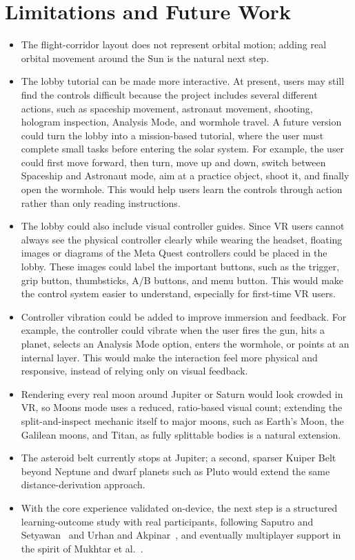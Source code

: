 \documentclass[journal]{vgtc}
\begin{document}
\section{Limitations and Future Work}
\begin{itemize}
\item The flight-corridor layout does not represent orbital motion; adding real orbital movement around the Sun is the natural next step.

\item The lobby tutorial can be made more interactive. At present, users may still find the controls difficult because the project includes several different actions, such as spaceship movement, astronaut movement, shooting, hologram inspection, Analysis Mode, and wormhole travel. A future version could turn the lobby into a mission-based tutorial, where the user must complete small tasks before entering the solar system. For example, the user could first move forward, then turn, move up and down, switch between Spaceship and Astronaut mode, aim at a practice object, shoot it, and finally open the wormhole. This would help users learn the controls through action rather than only reading instructions.

\item The lobby could also include visual controller guides. Since VR users cannot always see the physical controller clearly while wearing the headset, floating images or diagrams of the Meta Quest controllers could be placed in the lobby. These images could label the important buttons, such as the trigger, grip button, thumbsticks, A/B buttons, and menu button. This would make the control system easier to understand, especially for first-time VR users.

\item Controller vibration could be added to improve immersion and feedback. For example, the controller could vibrate when the user fires the gun, hits a planet, selects an Analysis Mode option, enters the wormhole, or points at an internal layer. This would make the interaction feel more physical and responsive, instead of relying only on visual feedback.

\item Rendering every real moon around Jupiter or Saturn would look crowded in VR, so Moons mode uses a reduced, ratio-based visual count; extending the split-and-inspect mechanic itself to major moons, such as Earth's Moon, the Galilean moons, and Titan, as fully splittable bodies is a natural extension.

\item The asteroid belt currently stops at Jupiter; a second, sparser Kuiper Belt beyond Neptune and dwarf planets such as Pluto would extend the same distance-derivation approach.

\item With the core experience validated on-device, the next step is a structured learning-outcome study with real participants, following Saputro and Setyawan~\cite{saputro2020} and Urhan and Akpinar~\cite{urhan2024}, and eventually multiplayer support in the spirit of Mukhtar et al.~\cite{mukhtar2019}.
\end{itemize}
\end{document}
